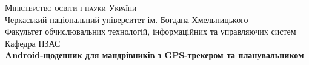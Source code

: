 \documentclass[../main.tex]{subfiles}
\begin{document}
\begin{titlepage}
    \centering
    {\scshape\LARGE Міністерство освіти і науки України \\}
    \vspace{1.5cm}
    {\Large Черкаський національний університет ім. Богдана Хмельницького \\}
    \vspace{1.5cm}
    {\large Факультет обчислювальних технологій, інформаційних та управляючих систем \\}
    \vspace{0.5cm}
    {\large Кафедра ПЗАС \\}
    \vspace{1.5cm}
    {\huge\bfseries Android-щоденник для мандрівників з GPS-трекером та планувальником \\}
\end{titlepage}
\end{document}
